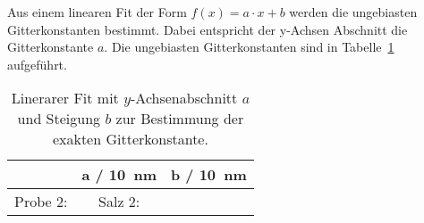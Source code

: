 Aus einem linearen Fit der Form $f(x) = a \cdot x + b$ werden die ungebiasten
Gitterkonstanten bestimmt.
Dabei entspricht der y-Achsen Abschnitt die Gitterkonstante $a$.
Die ungebiasten Gitterkonstanten sind in Tabelle~\ref{tab:gitt} aufgeführt.

\begin{table}[ht]
		\centering
		\caption{Linerarer Fit mit $y$-Achsenabschnitt $a$ und Steigung $b$ zur
				Bestimmung der exakten Gitterkonstante.}
		\label{tab:gitt}
		\begin{tabular}{l c c}
				\toprule
        & a / \SI{10}{\nano\meter} & b / \SI{10}{\nano\meter} \\
				\midrule
				Probe 2: 	& 
				Salz 2: 	& 
				\bottomrule
		\end{tabular}
\end{table}
